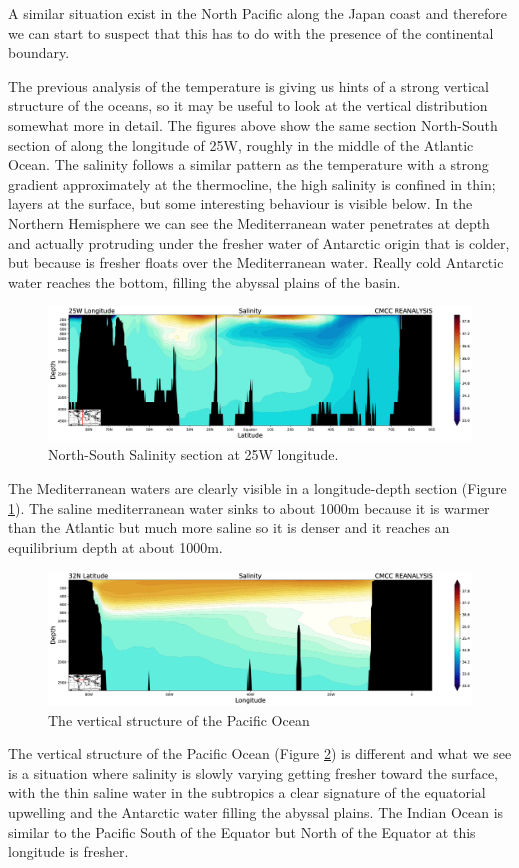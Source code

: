 A similar situation exist in the North Pacific along the Japan coast and
therefore we can start to suspect that this has to do with the presence
of the continental boundary.

The previous analysis of the temperature is giving us hints of a strong
vertical structure of the oceans, so it may be useful to look at the
vertical distribution somewhat more in detail. The figures above show the same section North-South section of along the longitude of 25W, roughly in the middle of the Atlantic Ocean.
The salinity follows a similar pattern as the temperature with a
strong gradient approximately at the thermocline, the high salinity is
confined in thin; layers at the surface, but some interesting behaviour
is visible below. In the Northern Hemisphere we can see the
Mediterranean water penetrates at depth and actually protruding under the fresher water of Antarctic origin that is colder, but because is
fresher floats over the Mediterranean water. Really cold Antarctic water reaches the bottom, filling the abyssal plains of the basin.

\begin{figure}[htpb!]
	\centering
	\includegraphics[width = 0.5 \textwidth]{upload/31image.png}
	\caption{North-South Salinity section at 25W longitude.}
	\label{fig:fig6}
\end{figure}

The Mediterranean waters are clearly visible in a longitude-depth
section (Figure \ref{fig:fig6}). The saline mediterranean water sinks
to about 1000m because it is warmer than the Atlantic but much more
saline so it is denser and it reaches an equilibrium depth at about
1000m.

\begin{figure}[htpb!]
	\centering
	\includegraphics[width=0.5\linewidth]{upload/32image.png}
	\caption{The vertical structure of the Pacific Ocean}
	\label{fig:fig7}
\end{figure}


The vertical structure of the Pacific Ocean (Figure \ref{fig:fig7}) is
different and what we see is a situation where salinity is slowly
varying getting fresher toward the surface, with the thin saline water
in the subtropics a clear signature of the equatorial upwelling and the
Antarctic water filling the abyssal plains. The Indian Ocean is similar
to the Pacific South of the Equator but North of the Equator at this
longitude is fresher.

